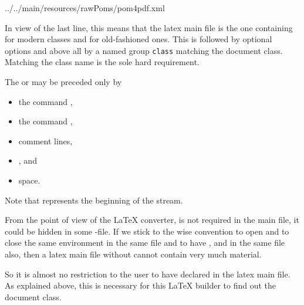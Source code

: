 
{../../main/resources/rawPoms/pom4pdf.xml}%


In view of the last line, this means that the latex main file is the one 
containing  for modern classes 
and  for old-fashioned ones. 
This is followed by optional options and above all by a named group \texttt{class} 
matching the document class. 
Matching the class name is the sole hard requirement. 

The  or  
may be preceded only by 
%
\begin{itemize}
\item
the command , 
\item
the command , 
\item
comment lines, 
\item
{}, and 
\item
space. 
\end{itemize}
%
Note that  represents the beginning of the stream. 

From the point of view of the \LaTeX{} converter, 
 is not required in the main file, 
it could be hidden in some -file. 
If we stick to the wise convention to open and to close the same environment 
in the same file and to have , 
 and  
in the same file also, 
then a latex main file without  
cannot contain very much material. 

So it is almost no restriction to the user to have  
declared in the latex main file. 
As explained above, this is necessary for this \LaTeX{} builder to find out the document class. 



